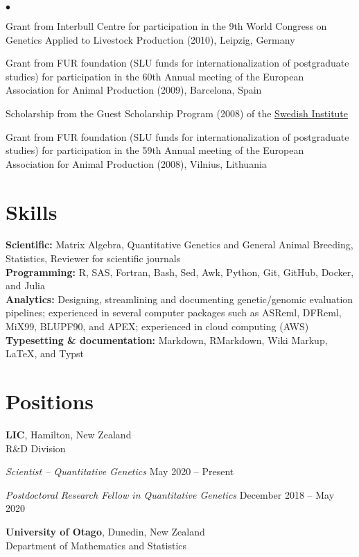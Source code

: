 \documentclass[margin,line]{res}
\newenvironment{list2}{
  \begin{list}{$\bullet$}{%
    \setlength{\itemsep}{0in}
    \setlength{\parsep}{0in} \setlength{\parskip}{0in}
    \setlength{\topsep}{0in} \setlength{\partopsep}{0in}
    \setlength{\leftmargin}{0.2in}}}
  {\end{list}}
\begin{document}
\begin{resume}
  \begin{list2}
    \item Grant from Interbull Centre for participation in the 9th World Congress on Genetics Applied to Livestock Production (2010), Leipzig, Germany
    \item Grant from FUR foundation (SLU funds for internationalization of postgraduate studies) for participation in the 60th Annual meeting of the European Association for Animal Production (2009), Barcelona, Spain
    \item Scholarship from the Guest Scholarship Program (2008) of the \href{https://si.se/en}{Swedish Institute}
    \item Grant from FUR foundation (SLU funds for internationalization of postgraduate studies) for participation in the 59th Annual meeting of the European Association for Animal Production (2008), Vilnius, Lithuania
  \end{list2}
  \section{\sc Skills}

  {\bf Scientific:} Matrix Algebra, Quantitative Genetics and General Animal Breeding, Statistics, Reviewer for scientific journals \\
  {\bf Programming:} R, SAS, Fortran, Bash, Sed, Awk, Python, Git, GitHub, Docker, and Julia \\
  {\bf Analytics:} Designing, streamlining and documenting genetic/genomic evaluation pipelines; experienced in several computer packages such as ASReml, DFReml, MiX99, BLUPF90, and APEX; experienced in cloud computing (AWS) \\
  {\bf Typesetting \& documentation:} Markdown, RMarkdown, Wiki Markup, \LaTeX{}, and Typst
  \section{\sc Positions}

  {\bf LIC}, Hamilton, New Zealand \\
  R\&D Division
  
  {\em Scientist -- Quantitative Genetics} \hfill{May 2020 -- Present}

  {\em Postdoctoral Research Fellow in Quantitative Genetics} \hfill{December 2018 -- May 2020}

  {\bf University of Otago}, Dunedin, New Zealand \\
  Department of Mathematics and Statistics
  

\end{resume}
\end{document}
